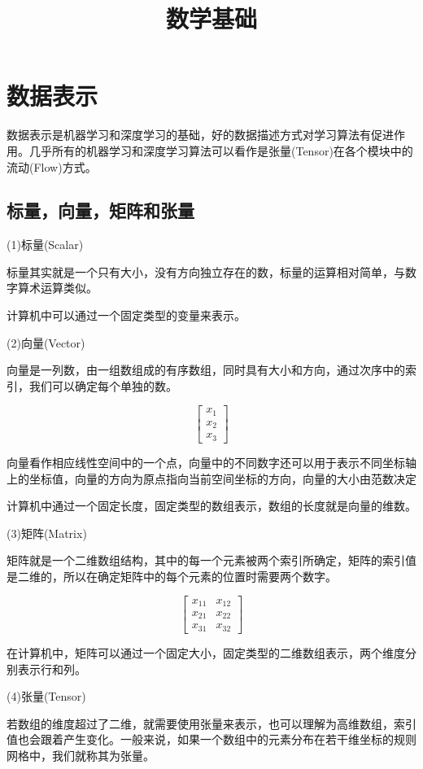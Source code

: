 \documentclass[openbib]{article}
\begin{document}
	\title{数学基础}

	\maketitle
	
	\newpage
	\tableofcontents
	\newpage
\section{数据表示}
	数据表示是机器学习和深度学习的基础，好的数据描述方式对学习算法有促进作用。几乎所有的机器学习和深度学习算法可以看作是张量(Tensor)在各个模块中的流动(Flow)方式。
\subsection{标量，向量，矩阵和张量}
(1)标量(Scalar)

标量其实就是一个只有大小，没有方向独立存在的数，标量的运算相对简单，与数字算术运算类似。

计算机中可以通过一个固定类型的变量来表示。

(2)向量(Vector)

向量是一列数，由一组数组成的有序数组，同时具有大小和方向，通过次序中的索引，我们可以确定每个单独的数。

\[\begin{bmatrix}
	x_1 \\x_2  \\x_3 
\end{bmatrix}\]

向量看作相应线性空间中的一个点，向量中的不同数字还可以用于表示不同坐标轴上的坐标值，向量的方向为原点指向当前空间坐标的方向，向量的大小由范数决定

计算机中通过一个固定长度，固定类型的数组表示，数组的长度就是向量的维数。

(3)矩阵(Matrix)

矩阵就是一个二维数组结构，其中的每一个元素被两个索引所确定，矩阵的索引值是二维的，所以在确定矩阵中的每个元素的位置时需要两个数字。

\[\begin{bmatrix}
	x_{11} & x_{12} \\x_{21} & x_{22}  \\x_{31}& x_{32} 
\end{bmatrix}\]

在计算机中，矩阵可以通过一个固定大小，固定类型的二维数组表示，两个维度分别表示行和列。

(4)张量(Tensor)

若数组的维度超过了二维，就需要使用张量来表示，也可以理解为高维数组，索引值也会跟着产生变化。一般来说，如果一个数组中的元素分布在若干维坐标的规则网格中，我们就称其为张量。
\end{document}

